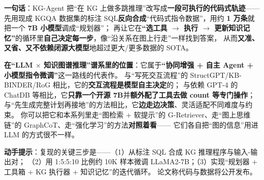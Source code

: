 \documentclass[11pt,UTF8,fontset=fandol]{ctexart}
\begin{document}
\textbf{一句话}：KG-Agent 把“在 KG 上做多跳推理”改写成\textbf{一段可执行的代码式轨迹}——
先用现成 KGQA 数据集的标注 SQL\textbf{反向合成}“代码式指令数据”，用约 \textbf{1 万条}就把一个 \textbf{7B 小模型}调成“规划器”；
再让它在\textbf{“选工具 $\to$ 执行 $\to$ 更新知识记忆”}的循环里\textbf{自己决定每一步}，像“沿关系在图上行走”一样找到答案，
从而\textbf{又准、又省、又不依赖闭源大模型}地超过更大/更多数据的 SOTA。

\textbf{在“LLM $\times$ 知识图谱推理”谱系里的位置}：它属于\textbf{“协同增强 + 自主 Agent + 小模型指令微调”}这一路线的代表作。
与“写死交互流程”的 StructGPT/KB-BINDER/RoG 相比，它的\textbf{交互流程是模型自主决定}的；
与依赖 GPT-4 的 ChatDB 等相比，它\textbf{只靠一个开源 7B}并\textbf{额外配了工具去做 count 等专门操作}；
与“先生成完整计划再接地”的方法相比，它\textbf{边走边决策}、灵活适配不同难度与约束。
你可以把它和本系列里走“图检索 + 软提示”的 G-Retriever、走“图上思维链”的 GraphCoT、走“强化学习”的方法\textbf{对照着看}——
它们各自把“图的信息”用进 LLM 的方式很不一样。

\textbf{动手提示}：复现的关键三步是——（1）从标注 SQL 合成 KG 推理程序与输入-输出对；
（2）用 1:5:5:10 比例约 10K 样本微调 LLaMA2-7B；（3）实现“规划器 + 工具箱 + KG 执行器 + 知识记忆”的迭代循环。
论文称代码与数据将公开发布。
\end{document}
